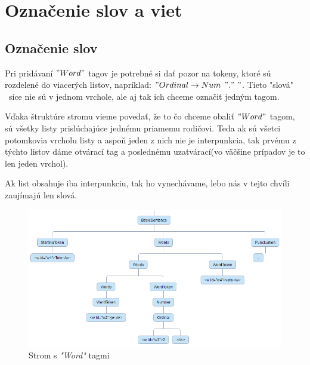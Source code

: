 \documentclass[12pt,a4paper]{report}
\theoremstyle{definition}
\theoremstyle{remark}
\begin{document}
\section{Označenie slov a viet}
\subsection{Označenie slov}
Pri pridávaní $"Word"$ tagov je potrebné si dať pozor na tokeny, ktoré sú rozdelené do viacerých listov, napríklad: $"Ordinal \to Num $ $ "." \ "$. Tieto "slová"  \ síce nie sú v jednom vrchole, ale aj tak ich chceme označiť jedným tagom.

Vďaka štruktúre stromu vieme povedať, že to čo chceme obaliť $"Word"$ tagom, sú všetky listy prislúchajúce jednému priamemu rodičovi. Teda ak sú všetci potomkovia vrcholu listy a aspoň jeden z nich nie je interpunkcia, tak prvému z týchto listov dáme otvárací tag a poslednému uzatvárací(vo väčšine prípadov je to len jeden vrchol).


Ak list obsahuje iba interpunkciu, tak ho vynechávame, lebo nás v tejto chvíli zaujímajú len slová.

\begin{figure}[H]
\centering
\includegraphics[scale=2]{treeWordsAdded}
\caption{Strom s \textit{"Word"} tagmi}
\end{figure}
\end{document}
